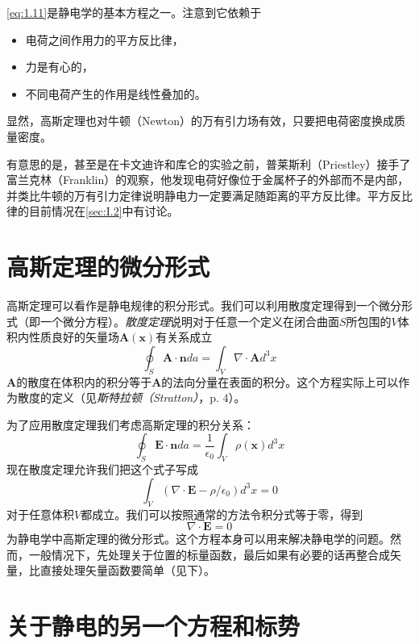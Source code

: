 \documentclass[12pt]{book}
\numberwithin{equation}{chapter}
\numberwithin{figure}{chapter}
\numberwithin{footnote}{page}
\begin{document}
\autoref{eq:1.11}是静电学的基本方程之一。注意到它依赖于
\begin{itemize}
    \item 电荷之间作用力的平方反比律，
    \item 力是有心的，
    \item 不同电荷产生的作用是线性叠加的。
\end{itemize}
显然，高斯定理也对牛顿（Newton）的万有引力场有效，只要把电荷密度换成质量密度。

有意思的是，甚至是在卡文迪许和库仑的实验之前，普莱斯利（Priestley）接手了富兰克林（Franklin）的观察，他发现电荷好像位于金属杯子的外部而不是内部，并类比牛顿的万有引力定律说明静电力一定要满足随距离的平方反比律。平方反比律的目前情况在\autoref{sec:I.2}中有讨论。

\section{高斯定理的微分形式}\label{sec:1.4}

高斯定理可以看作是静电规律的积分形式。我们可以利用散度定理得到一个微分形式（即一个微分方程）。\textit{散度定理}说明对于任意一个定义在闭合曲面$S$所包围的$V$体积内性质良好的矢量场$\mathbf{A}(\mathbf{x})$有关系成立
$$\oint_S \mathbf{A}\cdot\mathbf{n}da=\int_V \nabla\cdot\mathbf{A}d^3x$$
$\mathbf{A}$的散度在体积内的积分等于$\mathbf{A}$的法向分量在表面的积分。这个方程实际上可以作为散度的定义（见\textit{斯特拉顿（Stratton）}，p. 4）。

为了应用散度定理我们考虑高斯定理的积分关系：
$$\oint_S \mathbf{E}\cdot\mathbf{n}da=\frac{1}{\epsilon_0}\int_V \rho(\mathbf{x})d^3x$$
现在散度定理允许我们把这个式子写成
\begin{equation}\label{eq:1.12}
    \int_V (\nabla\cdot\mathbf{E}-\rho/\epsilon_0)d^3x=0
\end{equation}
对于任意体积$V$都成立。我们可以按照通常的方法令积分式等于零，得到
\begin{equation}\label{eq:1.13}
    \nabla\cdot\mathbf{E}=0
\end{equation}
为静电学中高斯定理的微分形式。这个方程本身可以用来解决静电学的问题。然而，一般情况下，先处理关于位置的标量函数，最后如果有必要的话再整合成矢量，比直接处理矢量函数要简单（见下）。

\section{关于静电的另一个方程和标势}\label{sec:1.5}
\end{document}
